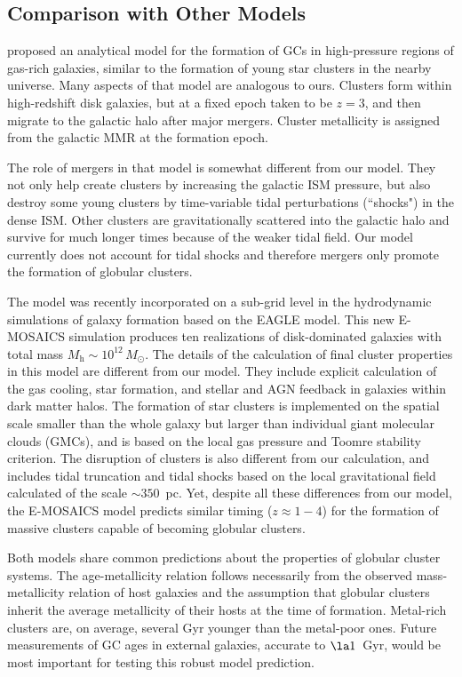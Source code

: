 \documentclass[fleqn,usenatbib]{mnras}
\newcommand{\Mh}{M_{\mathrm{h}}}
\newcommand{\Msun}{\,M_{\odot}}
\begin{document}
\subsection{Comparison with Other Models}

\citet{kruijssen12, kruijssen2015} proposed an analytical model for the formation of GCs in high-pressure regions of gas-rich galaxies, similar to the formation of young star clusters in the nearby universe. Many aspects of that model are analogous to ours. Clusters form within high-redshift disk galaxies, but at a fixed epoch taken to be $z=3$, and then migrate to the galactic halo after major mergers. Cluster metallicity is assigned from the galactic MMR at the formation epoch.

The role of mergers in that model is somewhat different from our model. They not only help create clusters by increasing the galactic ISM pressure, but also destroy some young clusters by time-variable tidal perturbations (``shocks") in the dense ISM. Other clusters are gravitationally scattered into the galactic halo and survive for much longer times because of the weaker tidal field. Our model currently does not account for tidal shocks and therefore mergers only promote the formation of globular clusters.

The \citet{kruijssen12} model was recently incorporated on a sub-grid level in the hydrodynamic simulations of galaxy formation based on the EAGLE model. This new E-MOSAICS simulation \citep{pfeffer_etal_2017} produces ten realizations of disk-dominated galaxies with total mass $\Mh\sim 10^{12}\Msun$. The details of the calculation of final cluster properties in this model are different from our model. They include explicit calculation of the gas cooling, star formation, and stellar and AGN feedback in galaxies within dark matter halos. The formation of star clusters is implemented on the spatial scale smaller than the whole galaxy but larger than individual giant molecular clouds (GMCs), and is based on the local gas pressure and Toomre stability criterion. The disruption of clusters is also different from our calculation, and includes tidal truncation and tidal shocks based on the local gravitational field calculated of the scale $\sim 350$~pc. Yet, despite all these differences from our model, the E-MOSAICS model predicts similar timing ($z\approx 1-4$) for the formation of massive clusters capable of becoming globular clusters.

Both models share common predictions about the properties of globular cluster systems. The age-metallicity relation follows necessarily from the observed mass-metallicity relation of host galaxies and the assumption that globular clusters inherit the average metallicity of their hosts at the time of formation. Metal-rich clusters are, on average, several Gyr younger than the metal-poor ones. Future measurements of GC ages in external galaxies, accurate to $\la 1$~Gyr, would be most important for testing this robust model prediction.
\end{document}
